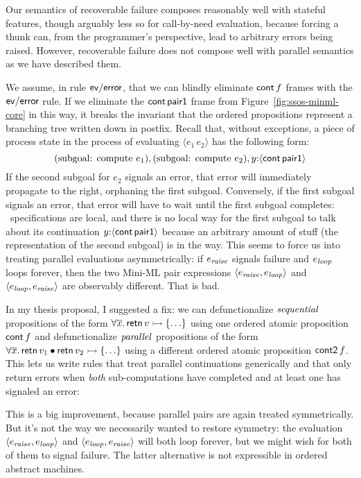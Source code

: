 Our semantics of recoverable failure composes reasonably well with
stateful features, though arguably less so for call-by-need
evaluation, because forcing a thunk can, from the programmer's
perspective, lead to arbitrary errors being raised. However,
recoverable failure does not compose well with parallel semantics as
we have described them. 

We assume, in rule ${\sf ev/error}$, that we can blindly eliminate
${\sf cont}\,f$ frames with the ${\sf ev/error}$ rule.  If we
eliminate the ${\sf cont}\,{\sf pair1}$ frame from
Figure~\ref{fig:ssos-minml-core} in this way, it breaks the invariant
that the ordered propositions represent a branching tree written down
in postfix. Recall that, without exceptions, a piece of process state
in the process of evaluating $\langle e_1\,e_2\rangle$ has the
following form:
\[
\mbox{(subgoal: compute $e_1$)},
\mbox{(subgoal: compute $e_2$)},
y{:}\langle {{\sf cont}\,{\sf pair1}} \rangle 
\]
If the second subgoal for $e_2$ signals an error, that error will
immediately propagate to the right, orphaning the first subgoal.
Conversely, if the first subgoal signals an error, that error will
have to wait until the first subgoal completes: \sls~specifications
are local, and there is no local way for the first subgoal to talk
about its continuation $y{:}\langle {{\sf cont}\,{\sf pair1}} \rangle$ because an
arbitrary amount of stuff (the representation of the second subgoal)
is in the way. This seems to force us into treating parallel
evaluations asymmetrically: if $e_{\it raise}$ signals failure and
$e_{\it loop}$ loops forever, then the two Mini-ML pair expressions
$\langle e_{\it raise}, e_{\it loop} \rangle$ and $\langle e_{\it
  loop}, e_{\it raise} \rangle$ are observably different. That is bad.

In my thesis proposal, I suggested a fix: we can defunctionalize ${\it
  sequential}$ propositions of the form $\forall \overline{x}.\,{\sf
  retn}\,v \rightarrowtail \{\ldots \}$ using one ordered atomic proposition
${\sf cont}\,f$ and defunctionalize ${\it parallel}$ propositions of
the form $\forall \overline{x}.\,{\sf retn}\,v_1 \mathbin{\bullet} {\sf retn}\,v_2
\rightarrowtail \{\ldots \}$ using a different ordered atomic proposition ${\sf
  cont2}\,f$. This lets us write rules that treat parallel continuations
generically and that only return errors when {\it both} sub-computations
have completed and at least one has signaled an error: 


\noindent
This is a big improvement, because parallel pairs are again treated
symmetrically. But it's not the way we necessarily wanted to restore
symmetry: the evaluation $\langle e_{\it raise}, e_{\it loop} \rangle$
and $\langle e_{\it loop}, e_{\it raise} \rangle$ will both loop
forever, but we might wish for both of them to signal failure. The
latter alternative is not expressible in ordered abstract machines.

